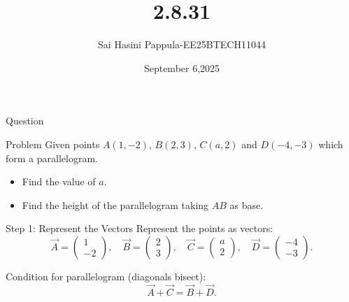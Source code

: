 \documentclass{beamer}
\title %
{2.8.31}
\date{September 6,2025}
\author %
{Sai Hasini Pappula-EE25BTECH11044}
\begin{document}
\begin{frame}{Question}
\begin{block}{Problem}
Given points $A(1,-2)$, $B(2,3)$, $C(a,2)$ and $D(-4,-3)$ which form a parallelogram. 

\begin{itemize}
    \item Find the value of $a$.
    \item Find the height of the parallelogram taking $AB$ as base.
\end{itemize}
\end{block}
\end{frame}

\begin{frame}{Step 1: Represent the Vectors}
Represent the points as vectors:
\begin{equation}
\vec A=\begin{pmatrix}1\\-2\end{pmatrix},\quad 
\vec B=\begin{pmatrix}2\\3\end{pmatrix},\quad 
\vec C=\begin{pmatrix}a\\2\end{pmatrix},\quad 
\vec D=\begin{pmatrix}-4\\-3\end{pmatrix}.
\end{equation}

Condition for parallelogram (diagonals bisect):
\begin{equation}
\vec A+\vec C=\vec B+\vec D.
\end{equation}
\end{frame}
\end{document}
